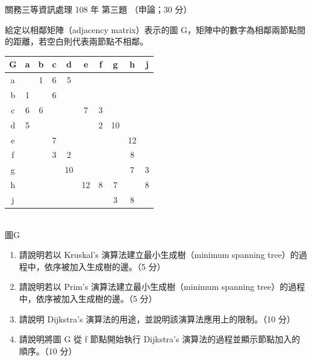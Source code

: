 \begin{pastexam}[label={px:gw3-108-ds-03}]{關務三等資訊處理 108 年 第三題}
（申論；30 分）

給定以相鄰矩陣（adjacency matrix）表示的圖 G，矩陣中的數字為相鄰兩節點間的距離，若空白則代表兩節點不相鄰。
\begin{center}
\begin{tabular}{|c|*{9}{c|}}
\hline
G & a & b & c & d & e & f & g & h & j \\
\hline
a & & 1 & 6 & 5 & & & & & \\
\hline
b & 1 & & 6 & & & & & & \\
\hline
c & 6 & 6 & & & 7 & 3 & & & \\
\hline
d & 5 & & & & & 2 & 10 & & \\
\hline
e & & & 7 & & & & & 12 & \\
\hline
f & & & 3 & 2 & & & & 8 & \\
\hline
g & & & & 10 & & & & 7 & 3 \\
\hline
h & & & & & 12 & 8 & 7 & & 8 \\
\hline
j & & & & & & & 3 & 8 & \\
\hline
\end{tabular}\\[0.3em]
圖G
\end{center}
\begin{enumerate}[leftmargin=2.2em]
\item[㈠] 請說明若以 Kruskal's 演算法建立最小生成樹（minimum spanning tree）的過程中，依序被加入生成樹的邊。（5 分）
\item[㈡] 請說明若以 Prim's 演算法建立最小生成樹（minimum spanning tree）的過程中，依序被加入生成樹的邊。（5 分）
\item[㈢] 請說明 Dijkstra's 演算法的用途，並說明該演算法應用上的限制。（10 分）
\item[㈣] 請說明將圖 G 從 f 節點開始執行 Dijkstra's 演算法的過程並顯示節點加入的順序。（10 分）
\end{enumerate}
\end{pastexam}

